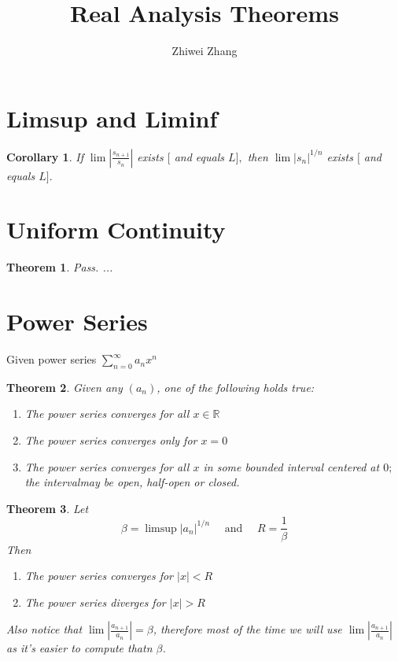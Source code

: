 \documentclass[12pt]{article}
\newtheorem{theorem}{Theorem}[section]
\newtheorem{corollary}{Corollary}[theorem]
\begin{document}
 
 
 
\title{Real Analysis Theorems}
\author{Zhiwei Zhang}
 
\maketitle
\section{Limsup and Liminf}
\begin{corollary}
	If $\lim \left| \frac { s _ { n + 1 } } { s _ { n } } \right|$ exists $[$ and equals $L ] ,$ then $\lim \left| s _ { n } \right| ^ { 1 / n } $ exists $[$ and
	equals $L ] .$
\end{corollary}

\section{Uniform Continuity}
\begin{theorem}
	Pass. ...
\end{theorem}
\section{Power Series}
Given power series $\sum _ { n = 0 } ^ { \infty } a _ { n } x ^ { n }$
\begin{theorem}
Given any $(a_n)$, one of the following holds true:
\begin{enumerate}
	\item The power series converges for all $x \in \mathbb{R}$
	\item The power series converges only for $x = 0$
	\item The power series converges for all $x$ in some bounded interval centered at $0 ;$ the intervalmay be open, half-open or closed.
\end{enumerate}
\end{theorem}

\begin{theorem}
	Let $$
	\beta = \limsup \left| a _ { n } \right| ^ { 1 / n } \quad \text { and } \quad R = \frac { 1 } { \beta }
	$$
	Then
	\begin{enumerate}
		\item The power series converges for  $|x| < R$
		\item The power series diverges for $|x| > R$
	\end{enumerate}
	
	Also notice that $\lim \left| \frac { a _ { n + 1 } } { a _ { n } } \right| = \beta$, therefore most of the time we will use $\lim \left| \frac { a _ { n + 1 } } { a _ { n } } \right|$ as it's easier to compute thatn $\beta$.
\end{theorem}
\end{document}
